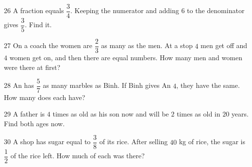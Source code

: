 \gap
\begin{probbox}{26}{\relax}
A fraction equals $\dfrac34$. Keeping the numerator and adding $6$ to the denominator gives $\dfrac35$. Find it.
\end{probbox}
\gap
\begin{probbox}{27}{\relax}
On a coach the women are $\dfrac23$ as many as the men. At a stop $4$ men get off and $4$ women get on, and then there are equal numbers. How many men and women were there at first?
\end{probbox}
\gap
\begin{probbox}{28}{\relax}
An has $\dfrac57$ as many marbles as Binh. If Binh gives An $4$, they have the same. How many does each have?
\end{probbox}
\gap
\begin{probbox}{29}{\relax}
A father is $4$ times as old as his son now and will be $2$ times as old in $20$ years. Find both ages now.
\end{probbox}
\gap
\begin{probbox}{30}{\relax}
A shop has sugar equal to $\dfrac38$ of its rice. After selling $40$ kg of rice, the sugar is $\dfrac12$ of the rice left. How much of each was there?
\end{probbox}
